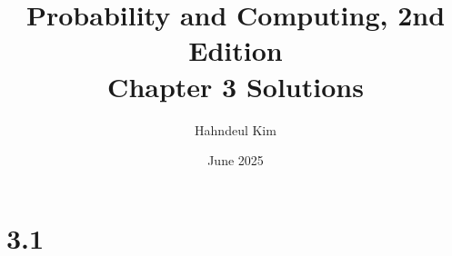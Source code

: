 \documentclass{article}
\title {Probability and Computing, 2nd Edition \\[2ex] \large Chapter 3 Solutions}
\author{Hahndeul Kim}
\date{June 2025}
\begin{document}
\maketitle
\newpage
\section*{3.1}
\end{document}
